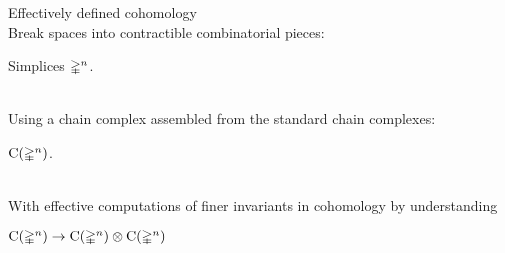 \begin{frame}{Effectively defined cohomology}
	\pause
	 \\
	Break spaces into contractible combinatorial pieces: \\
	\begin{center}
		Simplices $\mathbb{\Delta}^n$.
	\end{center}


	\pause
	 \\
	Using a chain complex assembled from the standard chain complexes: \\
	\begin{center}
		$\operatorname{C}(\mathbb{\Delta}^n)$.
	\end{center}

	\pause
	 \\
	With effective computations of finer invariants in cohomology by understanding

	\begin{center}
		$\operatorname{C}(\mathbb{\Delta}^n) \to \operatorname{C}(\mathbb{\Delta}^n) \otimes \operatorname{C}(\mathbb{\Delta}^n)$
	\end{center}
\end{frame}